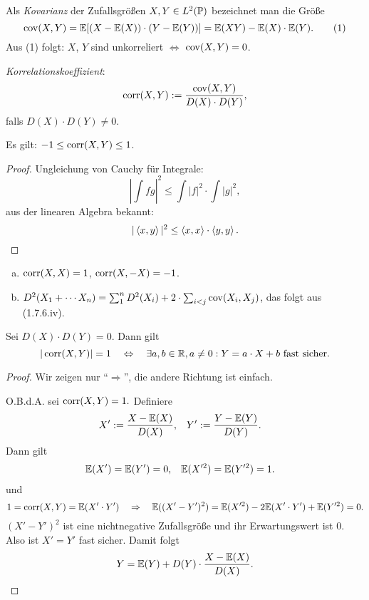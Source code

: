 \begin{defn}
  Als \emph{Kovarianz} der Zufallsgrößen $X,Y \in L^2(\mathbb{P})$ bezeichnet man die
  Größe
  \[ \operatorname{cov}(X,Y) = \mathbb{E}[ (X- \mathbb{E}(X)) \cdot (Y - \mathbb{E}(Y)) ] = \mathbb{E}(XY) - \mathbb{E}(X) \cdot
    \mathbb{E}(Y). \tag{1} \]
  Aus (1) folgt: $X$, $Y$ sind unkorreliert $\Leftrightarrow$ $\operatorname{cov}(X,Y) = 0$.

  \emph{Korrelationskoeffizient}:
  \[ \operatorname{corr}( X, Y ) := \frac{\operatorname{cov}(X,Y)}{D(X) \cdot D(Y)}, \]
  falls $D(X) \cdot D(Y) \ne 0$.

  Es gilt: $-1 \le \operatorname{corr}(X,Y) \le 1$.
  \begin{proof}
    Ungleichung von Cauchy für Integrale:
    \[ \left| \int f g \right|^2 \le \int |f|^2 \cdot \int |g|^2, \]
    aus der linearen Algebra bekannt:
    \[ |\left\langle x,y \right\rangle|^2 \le \left\langle x,x \right\rangle \cdot \left\langle y,y \right\rangle. \qedhere \]
  \end{proof}
\end{defn}

\begin{rmrk*}
  \begin{enumerate}[(a)]
  \item $\operatorname{corr} (X,X) = 1$, $\operatorname{corr}(X,-X) = -1$.
  \item $D^2(X_1 + \cdots X_n) = \sum_1^n D^2(X_i) + 2 \cdot \sum_{i<j}
      \operatorname{cov}(X_i, X_j)$, das folgt aus (1.7.6.iv).
  \end{enumerate}
\end{rmrk*}

\begin{thm}
  Sei $D(X) \cdot D(Y) = 0$. Dann gilt
  \[ |\operatorname{corr}(X,Y)| = 1 \quad \Leftrightarrow \quad \exists a,b \in \mathbb{R}, a \ne 0 : Y = a \cdot X + b
    \text{ fast sicher.} \]
\end{thm}

\begin{proof}
  Wir zeigen nur ``$\Rightarrow$'', die andere Richtung ist einfach.

  O.B.d.A. sei $\operatorname{corr}(X,Y) = 1.$ Definiere
  \begin{align*}
    X' &:= \frac{X - \mathbb{E}(X)}{D(X)}, & Y' &:= \frac{Y-\mathbb{E}(Y)}{D(Y)}.
  \end{align*}
  Dann gilt
  \begin{align*}
    \mathbb{E}(X') &= \mathbb{E}(Y') = 0, & \mathbb{E}(X'^2) &= \mathbb{E}(Y'^2) = 1.
  \end{align*}
  und
  \[ 1 = \operatorname{corr}(X,Y) = \mathbb{E}( X' \cdot Y' ) \quad \Rightarrow \quad \mathbb{E}( (X' - Y')^2 ) = 
    \mathbb{E}(X'^2) - 2 \mathbb{E}(X' \cdot Y') + \mathbb{E}(Y'^2) = 0. \]
  $(X'-Y')^2$ ist eine nichtnegative Zufallsgröße und ihr Erwartungswert ist 0.
  Also ist $X' = Y'$ fast sicher. Damit folgt
  \[ Y = \mathbb{E}(Y) + D(Y) \cdot \frac{X - \mathbb{E}(X)}{D(X)}. \qedhere \]
\end{proof}

